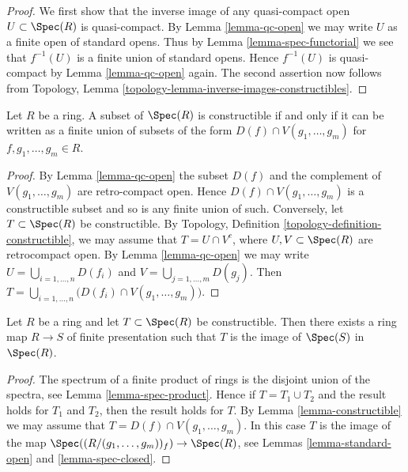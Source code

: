 \begin{proof}
We first show that the inverse image of any quasi-compact
open $U \subset \Spec(R)$ is quasi-compact. By
Lemma \ref{lemma-qc-open} we may write $U$ as a finite
open of standard opens. Thus by Lemma \ref{lemma-spec-functorial}
we see that $f^{-1}(U)$ is a finite union of standard opens.
Hence $f^{-1}(U)$ is quasi-compact by Lemma \ref{lemma-qc-open} again.
The second assertion now follows from Topology, Lemma
\ref{topology-lemma-inverse-images-constructibles}.
\end{proof}

\begin{lemma}
\label{lemma-constructible}
Let $R$ be a ring. A subset of $\Spec(R)$ is constructible if and only
if it can be written as a finite union of subsets of the form
$D(f) \cap V(g_1, \ldots, g_m)$ for $f, g_1, \ldots, g_m \in R$.
\end{lemma}

\begin{proof}
By Lemma \ref{lemma-qc-open} the subset $D(f)$ and the complement of
$V(g_1, \ldots, g_m)$ are retro-compact open. Hence
$D(f) \cap V(g_1, \ldots, g_m)$ is a constructible subset and so is
any finite union of such. Conversely, let $T \subset \Spec(R)$ be
constructible. By Topology, Definition \ref{topology-definition-constructible},
we may assume that $T = U \cap V^c$, where $U, V \subset \Spec(R)$
are retrocompact open. By Lemma \ref{lemma-qc-open} we may write
$U = \bigcup_{i = 1, \ldots, n} D(f_i)$ and
$V = \bigcup_{j = 1, \ldots, m} D(g_j)$. Then
$T = \bigcup_{i = 1, \ldots, n} \big(D(f_i) \cap V(g_1, \ldots, g_m)\big)$.
\end{proof}

\begin{lemma}
\label{lemma-constructible-is-image}
Let $R$ be a ring and let $T \subset \Spec(R)$
be constructible. Then there exists a ring map $R \to S$ of
finite presentation such that $T$ is the image of
$\Spec(S)$ in $\Spec(R)$.
\end{lemma}

\begin{proof}
The spectrum of a finite product of rings
is the disjoint union of the spectra, see
Lemma \ref{lemma-spec-product}. Hence if $T = T_1 \cup T_2$
and the result holds for $T_1$ and $T_2$, then the
result holds for $T$.
By Lemma \ref{lemma-constructible} we may assume
that $T = D(f) \cap V(g_1, \ldots, g_m)$.
In this case $T$ is the image of the map
$\Spec((R/(g_1, \ldots, g_m))_f) \to \Spec(R)$, see Lemmas
\ref{lemma-standard-open} and \ref{lemma-spec-closed}.
\end{proof}


